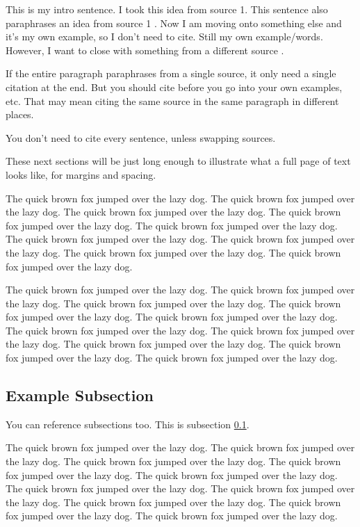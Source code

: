 \documentclass[
  12pt]{article}
\begin{document}
This is my intro sentence. I took this idea from source 1. This sentence
also paraphrases an idea from source 1 \citep{Campbell02}. Now I am
moving onto something else and it's my own example, so I don't need to
cite. Still my own example/words. However, I want to close with
something from a different source \citep{Chi81}.

If the entire paragraph paraphrases from a single source, it only need a
single citation at the end. But you should cite before you go into your
own examples, etc. That may mean citing the same source in the same
paragraph in different places.

You don't need to cite every sentence, unless swapping sources.

These next sections will be just long enough to illustrate what a full
page of text looks like, for margins and spacing.

The quick brown fox jumped over the lazy dog. The quick brown fox jumped
over the lazy dog. The quick brown fox jumped over the lazy dog. The
quick brown fox jumped over the lazy dog. The quick brown fox jumped
over the lazy dog. The quick brown fox jumped over the lazy dog. The
quick brown fox jumped over the lazy dog. The quick brown fox jumped
over the lazy dog. The quick brown fox jumped over the lazy dog.

The quick brown fox jumped over the lazy dog. The quick brown fox jumped
over the lazy dog. The quick brown fox jumped over the lazy dog. The
quick brown fox jumped over the lazy dog. The quick brown fox jumped
over the lazy dog. The quick brown fox jumped over the lazy dog. The
quick brown fox jumped over the lazy dog. The quick brown fox jumped
over the lazy dog. The quick brown fox jumped over the lazy dog. The
quick brown fox jumped over the lazy dog.

\subsection{Example Subsection}\label{sec-verify-sub1}

You can reference subsections too. This is subsection
\ref{sec-verify-sub1}.

The quick brown fox jumped over the lazy dog. The quick brown fox jumped
over the lazy dog. The quick brown fox jumped over the lazy dog. The
quick brown fox jumped over the lazy dog. The quick brown fox jumped
over the lazy dog. The quick brown fox jumped over the lazy dog. The
quick brown fox jumped over the lazy dog. The quick brown fox jumped
over the lazy dog. The quick brown fox jumped over the lazy dog. The
quick brown fox jumped over the lazy dog.
\end{document}

